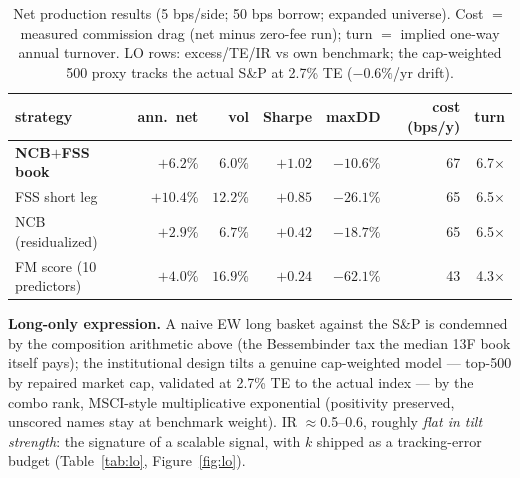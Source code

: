 \documentclass[10pt]{article}
\begin{document}
\begin{table}[h]
\centering\scriptsize
\caption{Net production results (5 bps/side; 50 bps borrow;
expanded universe). Cost $=$ measured commission drag (net minus
zero-fee run); turn $=$ implied one-way annual turnover. LO rows:
excess/TE/IR vs own benchmark; the cap-weighted 500 proxy tracks
the actual S\&P at 2.7\% TE ($-0.6\%$/yr drift).}
\begin{tabular}{lrrrrrr}
\toprule
strategy & ann.\ net & vol & Sharpe & maxDD & cost (bps/y) & turn \\
\midrule
\textbf{NCB$+$FSS book} & $+6.2\%$ & $6.0\%$ & $\mathbf{+1.02}$ & $-10.6\%$ & 67 & 6.7$\times$ \\
FSS short leg & $+10.4\%$ & $12.2\%$ & $+0.85$ & $-26.1\%$ & 65 & 6.5$\times$ \\
NCB (residualized) & $+2.9\%$ & $6.7\%$ & $+0.42$ & $-18.7\%$ & 65 & 6.5$\times$ \\
FM score (10 predictors) & $+4.0\%$ & $16.9\%$ & $+0.24$ & $-62.1\%$ & 43 & 4.3$\times$ \\
\bottomrule
\end{tabular}
\end{table}
\vspace{-4pt}

\textbf{Long-only expression.} A naive EW long basket against the
S\&P is condemned by the composition arithmetic above (the
Bessembinder tax the median 13F book itself pays); the institutional
design tilts a genuine cap-weighted model --- top-500 by repaired
market cap, validated at 2.7\% TE to the actual index --- by the
combo rank, MSCI-style multiplicative exponential (positivity
preserved, unscored names stay at benchmark weight). IR
$\approx$0.5--0.6, roughly \emph{flat in tilt strength}: the
signature of a scalable signal, with $k$ shipped as a tracking-error
budget (Table~\ref{tab:lo}, Figure~\ref{fig:lo}).
\end{document}
